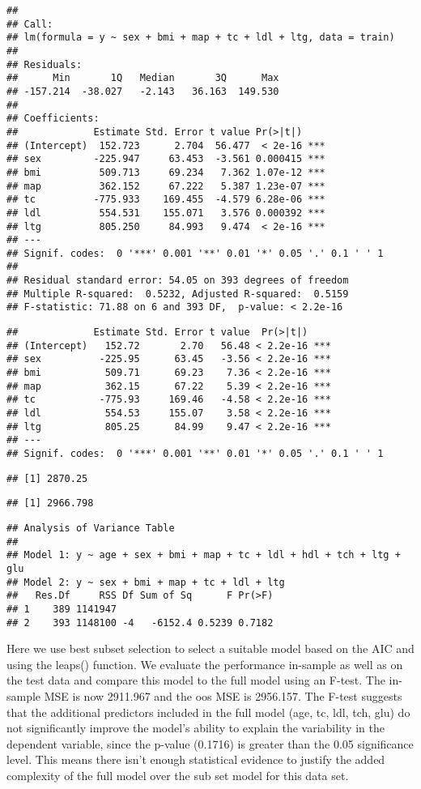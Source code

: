 \documentclass[
]{article}
\begin{document}
\begin{verbatim}
## 
## Call:
## lm(formula = y ~ sex + bmi + map + tc + ldl + ltg, data = train)
## 
## Residuals:
##      Min       1Q   Median       3Q      Max 
## -157.214  -38.027   -2.143   36.163  149.530 
## 
## Coefficients:
##             Estimate Std. Error t value Pr(>|t|)    
## (Intercept)  152.723      2.704  56.477  < 2e-16 ***
## sex         -225.947     63.453  -3.561 0.000415 ***
## bmi          509.713     69.234   7.362 1.07e-12 ***
## map          362.152     67.222   5.387 1.23e-07 ***
## tc          -775.933    169.455  -4.579 6.28e-06 ***
## ldl          554.531    155.071   3.576 0.000392 ***
## ltg          805.250     84.993   9.474  < 2e-16 ***
## ---
## Signif. codes:  0 '***' 0.001 '**' 0.01 '*' 0.05 '.' 0.1 ' ' 1
## 
## Residual standard error: 54.05 on 393 degrees of freedom
## Multiple R-squared:  0.5232, Adjusted R-squared:  0.5159 
## F-statistic: 71.88 on 6 and 393 DF,  p-value: < 2.2e-16
\end{verbatim}

\begin{verbatim}
##             Estimate Std. Error t value  Pr(>|t|)    
## (Intercept)   152.72       2.70   56.48 < 2.2e-16 ***
## sex          -225.95      63.45   -3.56 < 2.2e-16 ***
## bmi           509.71      69.23    7.36 < 2.2e-16 ***
## map           362.15      67.22    5.39 < 2.2e-16 ***
## tc           -775.93     169.46   -4.58 < 2.2e-16 ***
## ldl           554.53     155.07    3.58 < 2.2e-16 ***
## ltg           805.25      84.99    9.47 < 2.2e-16 ***
## ---
## Signif. codes:  0 '***' 0.001 '**' 0.01 '*' 0.05 '.' 0.1 ' ' 1
\end{verbatim}

\begin{verbatim}
## [1] 2870.25
\end{verbatim}

\begin{verbatim}
## [1] 2966.798
\end{verbatim}

\begin{verbatim}
## Analysis of Variance Table
## 
## Model 1: y ~ age + sex + bmi + map + tc + ldl + hdl + tch + ltg + glu
## Model 2: y ~ sex + bmi + map + tc + ldl + ltg
##   Res.Df     RSS Df Sum of Sq      F Pr(>F)
## 1    389 1141947                           
## 2    393 1148100 -4   -6152.4 0.5239 0.7182
\end{verbatim}

Here we use best subset selection to select a suitable model based on
the AIC and using the leaps() function. We evaluate the performance
in-sample as well as on the test data and compare this model to the full
model using an F-test. The in-sample MSE is now 2911.967 and the oos MSE
is 2956.157. The F-test suggests that the additional predictors included
in the full model (age, tc, ldl, tch, glu) do not significantly improve
the model's ability to explain the variability in the dependent
variable, since the p-value (0.1716) is greater than the 0.05
significance level. This means there isn't enough statistical evidence
to justify the added complexity of the full model over the sub set model
for this data set.
\end{document}
